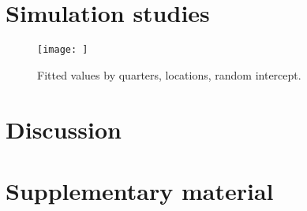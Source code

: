 \documentclass[a4paper,12pt]{article}
\begin{document}
\section{Simulation studies}
\label{simulation}

\begin{figure}[H]
 \centering
 \texttt{[image: ]}
 \caption{Fitted values by quarters, locations, random intercept.}
 \label{fig:FittedIQA}
\end{figure}

\section{Discussion}
\label{discussion}

\section*{Supplementary material}



\end{document}
